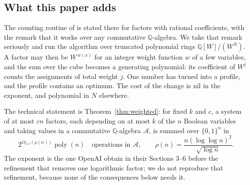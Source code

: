 \documentclass[11pt,reqno]{amsart}
\numberwithin{equation}{section}
\theoremstyle{plain}
\theoremstyle{definition}
\theoremstyle{remark}
\DeclareMathOperator{\poly}{poly}
\newcommand{\A}{\mathcal{A}}
\newcommand{\Q}{\mathbb{Q}}
\newcommand{\rhon}{\rho}
\newcommand{\oai}{OpenAI}
\begin{document}
\subsection{What this paper adds}
The counting routine of \cite{OAI26} is stated there for factors with rational
coefficients, with the remark that it works over any commutative $\Q$-algebra.
We take that remark seriously and run the algorithm over truncated polynomial
rings $\Q[W]/(W^{N})$. A factor may then be $W^{\,w(x)}$ for an integer weight
function $w$ of a few variables, and the sum over the cube becomes a generating
polynomial: its coefficient of $W^{j}$ counts the assignments of total weight
$j$. One number has turned into a profile, and the profile contains an optimum.
The cost of the change is nil in the exponent, and polynomial in $N$ elsewhere.

The technical statement is Theorem~\ref{thm:weighted}: for fixed $k$ and $c$, a
system of at most $cn$ factors, each depending on at most $k$ of the $n$ Boolean
variables and taking values in a commutative $\Q$-algebra $\A$, is summed over
$\{0,1\}^n$ in
\begin{equation}\label{eq:rho}
  2^{O_{k,c}(\rhon(n))}\poly(n) \quad\text{operations in $\A$},\qquad
  \rhon(n)=\frac{n(\log\log n)^2}{\sqrt{\log n}} .
\end{equation}
The exponent is the one \oai{} obtain in their Sections 3--6 before the
refinement that removes one logarithmic factor; we do not reproduce that
refinement, because none of the consequences below needs it.
\end{document}
